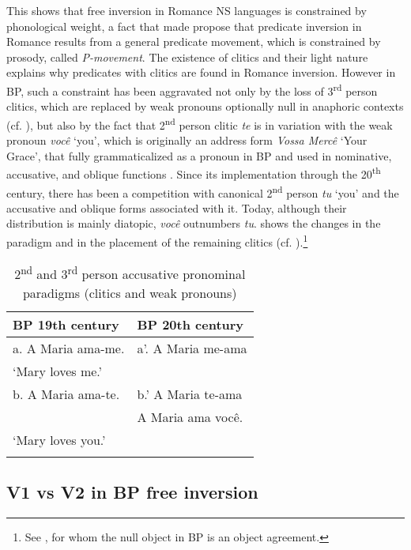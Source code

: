 \documentclass[output=paper,colorlinks,citecolor=brown]{langscibook}
\begin{document}
This shows that free inversion in Romance NS languages is constrained by phonological weight, a fact that made \citet{zubizarreta_prosody_1998} propose that predicate inversion in Romance results from a general predicate movement, which is constrained by prosody, called \emph{P-movement}. The existence of clitics and their light nature explains why predicates with clitics are found in Romance inversion. However in BP, such a constraint has been aggravated not only by the loss of 3\textsuperscript{rd} person clitics, which are replaced by weak pronouns optionally null in anaphoric contexts (cf. \citealt{kato_loss_1993}), but also by the fact that 2\textsuperscript{nd} person clitic \emph{te} is in variation with the weak pronoun \emph{você} ‘you', which is originally an address form \emph{Vossa Mercê} ‘Your Grace', that fully grammaticalized as a pronoun in BP and used in nominative, accusative, and oblique functions \citep{lopes2016}. Since its implementation through the 20\textsuperscript{th} century, there has been a competition with canonical 2\textsuperscript{nd} person \emph{tu} ‘you' and the accusative and oblique forms associated with it. Today, although their distribution is mainly diatopic, \emph{você} outnumbers \emph{tu}.  shows the changes in the paradigm and in the placement of the remaining clitics (cf. \citealt{kato_distribution_1993}).\footnote{See \citet{nunes2019}, for whom the null object in BP is an object agreement.}

\begin{table}
\caption{2\textsuperscript{nd} and 3\textsuperscript{rd} person accusative pronominal paradigms (clitics and weak pronouns)}
\label{03:table1}
 \begin{tabular}{ll}
  \lsptoprule
  BP  19th century & BP 20th century \\
  \midrule
a. A Maria ama-me. & a’. A Maria me-ama \\
\multicolumn{2}{l}{‘Mary loves me.’}\\
\tablevspace
b. A Maria ama-te.    & b.' A Maria te-ama \\
& \hphantom{b.' }A Maria ama você.\\
\multicolumn{2}{l}{‘Mary loves you.’}\\

  \lspbottomrule
 \end{tabular}
\end{table}

\subsection{V1 vs V2 in BP free inversion}
\end{document}
